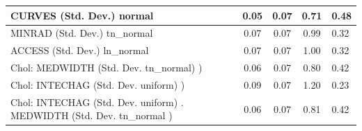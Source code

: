 \begin{table}
\begin{center}
\begin{tabular}{|l|l|c|c|c|l|}
			\hline
			CURVES (Std. Dev.) normal &  & 0.05 & 0.07 & 0.71 & 0.48 \\
			\hline
			MINRAD (Std. Dev.) tn_normal &  & 0.07 & 0.07 & 0.99 & 0.32 \\
			\hline
			ACCESS (Std. Dev.) ln_normal &  & 0.07 & 0.07 & 1.00 & 0.32 \\
			\hline
			 Chol: MEDWIDTH (Std. Dev. tn_normal) ) &  & 0.06 & 0.07 & 0.80 & 0.42 \\
			\hline
			 Chol: INTECHAG (Std. Dev. uniform) ) &  & 0.09 & 0.07 & 1.20 & 0.23 \\
			\hline
			 Chol: INTECHAG (Std. Dev. uniform) . MEDWIDTH (Std. Dev.   tn_normal ) &  & 0.06 & 0.07 & 0.81 & 0.42 \\
			\hline
		\end{tabular}
	\end{center}
\end{table}